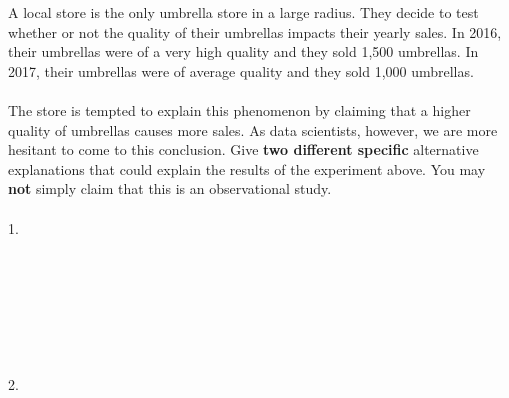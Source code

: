 \begin{enumerate}
 A local store is the only umbrella store in a large radius. They decide to test whether or not the quality of their umbrellas impacts their yearly sales. In 2016, their umbrellas were of a very high quality and they sold 1,500 umbrellas. In 2017, their umbrellas were of average quality and they sold 1,000 umbrellas. \\ \\
The store is tempted to explain this phenomenon by claiming that a higher quality of umbrellas causes more sales. As data scientists, however, we are more hesitant to come to this conclusion. Give \textbf{two different specific} alternative explanations that could explain the results of the experiment above. You may \textbf{not} simply claim that this is an observational study. 
\\ \\
1. \\ \\ \\ \\ \\ \\ \\ \\
2. \\ \\ \\ \\ \\ \\ \\ \\
\end{enumerate}



